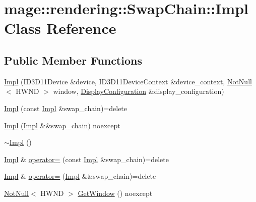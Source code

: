 \hypertarget{classmage_1_1rendering_1_1_swap_chain_1_1_impl}{}\section{mage\+:\+:rendering\+:\+:Swap\+Chain\+:\+:Impl Class Reference}
\label{classmage_1_1rendering_1_1_swap_chain_1_1_impl}
\subsection*{Public Member Functions}
\begin{DoxyCompactItemize}
\item 
\mbox{\hyperlink{classmage_1_1rendering_1_1_swap_chain_1_1_impl_a9631b95d63626a41575ca18aa6dec206}{Impl}} (I\+D3\+D11\+Device \&device, I\+D3\+D11\+Device\+Context \&device\+\_\+context, \mbox{\hyperlink{namespacemage_a8769f9d670d6b585ea306cb1062af94b}{Not\+Null}}$<$ H\+W\+ND $>$ window, \mbox{\hyperlink{classmage_1_1rendering_1_1_display_configuration}{Display\+Configuration}} \&display\+\_\+configuration)
\item 
\mbox{\hyperlink{classmage_1_1rendering_1_1_swap_chain_1_1_impl_a3e356f1260f5a0c63ef5623547720bc9}{Impl}} (const \mbox{\hyperlink{classmage_1_1rendering_1_1_swap_chain_1_1_impl}{Impl}} \&swap\+\_\+chain)=delete
\item 
\mbox{\hyperlink{classmage_1_1rendering_1_1_swap_chain_1_1_impl_aed29d0cdb54323cd670e5a690faed394}{Impl}} (\mbox{\hyperlink{classmage_1_1rendering_1_1_swap_chain_1_1_impl}{Impl}} \&\&swap\+\_\+chain) noexcept
\item 
\mbox{\hyperlink{classmage_1_1rendering_1_1_swap_chain_1_1_impl_ac41af1d1c99d284152447381045c169b}{$\sim$\+Impl}} ()
\item 
\mbox{\hyperlink{classmage_1_1rendering_1_1_swap_chain_1_1_impl}{Impl}} \& \mbox{\hyperlink{classmage_1_1rendering_1_1_swap_chain_1_1_impl_aabec221c1f9b95b5b8001823914e65b8}{operator=}} (const \mbox{\hyperlink{classmage_1_1rendering_1_1_swap_chain_1_1_impl}{Impl}} \&swap\+\_\+chain)=delete
\item 
\mbox{\hyperlink{classmage_1_1rendering_1_1_swap_chain_1_1_impl}{Impl}} \& \mbox{\hyperlink{classmage_1_1rendering_1_1_swap_chain_1_1_impl_a4a1fe13cc2fa4e40a2616aa1d8698912}{operator=}} (\mbox{\hyperlink{classmage_1_1rendering_1_1_swap_chain_1_1_impl}{Impl}} \&\&swap\+\_\+chain)=delete
\item 
\mbox{\hyperlink{namespacemage_a8769f9d670d6b585ea306cb1062af94b}{Not\+Null}}$<$ H\+W\+ND $>$ \mbox{\hyperlink{classmage_1_1rendering_1_1_swap_chain_1_1_impl_a58ee8003efb4b792d6e6315a1a691b5c}{Get\+Window}} () noexcept

\end{DoxyCompactItemize}

